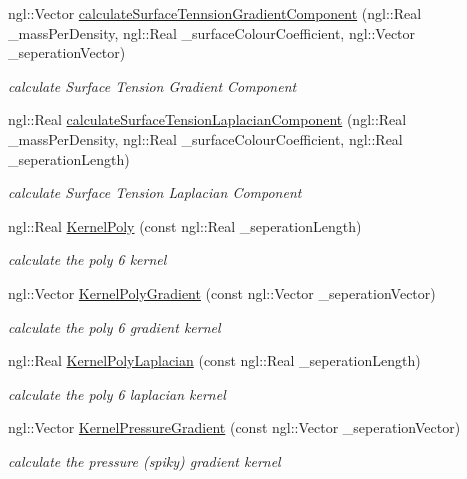 \begin{DoxyCompactItemize}
ngl::Vector \hyperlink{class_s_p_h_solver_a5ff4d84f41872763f04dfac24bda7e5d}{calculateSurfaceTennsionGradientComponent} (ngl::Real \_\-massPerDensity, ngl::Real \_\-surfaceColourCoefficient, ngl::Vector \_\-seperationVector)
\begin{DoxyCompactList}\small\item\em calculate Surface Tension Gradient Component \item\end{DoxyCompactList}\item 
ngl::Real \hyperlink{class_s_p_h_solver_abcc8f4b80a896833cdfb9f1ca71b28a2}{calculateSurfaceTensionLaplacianComponent} (ngl::Real \_\-massPerDensity, ngl::Real \_\-surfaceColourCoefficient, ngl::Real \_\-seperationLength)
\begin{DoxyCompactList}\small\item\em calculate Surface Tension Laplacian Component \item\end{DoxyCompactList}\item 
ngl::Real \hyperlink{class_s_p_h_solver_a293590ab5fbacd0a13bbd36dc3971e8d}{KernelPoly} (const ngl::Real \_\-seperationLength)
\begin{DoxyCompactList}\small\item\em calculate the poly 6 kernel \item\end{DoxyCompactList}\item 
ngl::Vector \hyperlink{class_s_p_h_solver_a2431a032b4972d7e684642e4d8c9e058}{KernelPolyGradient} (const ngl::Vector \_\-seperationVector)
\begin{DoxyCompactList}\small\item\em calculate the poly 6 gradient kernel \item\end{DoxyCompactList}\item 
ngl::Real \hyperlink{class_s_p_h_solver_ae0189c4c0301b0bb25d792b3b7ab08f5}{KernelPolyLaplacian} (const ngl::Real \_\-seperationLength)
\begin{DoxyCompactList}\small\item\em calculate the poly 6 laplacian kernel \item\end{DoxyCompactList}\item 
ngl::Vector \hyperlink{class_s_p_h_solver_a5086e88784204568d4cf4e227309025f}{KernelPressureGradient} (const ngl::Vector \_\-seperationVector)
\begin{DoxyCompactList}\small\item\em calculate the pressure (spiky) gradient kernel \item\end{DoxyCompactList}\item 

\end{DoxyCompactItemize}
